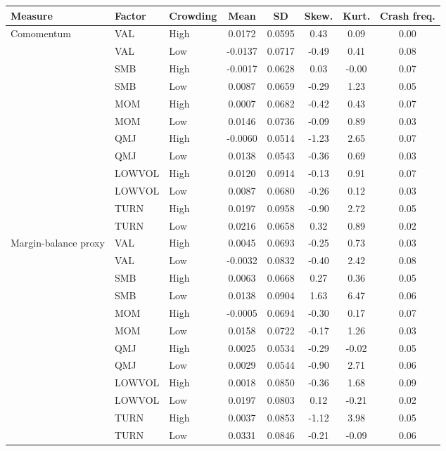 \begingroup\footnotesize\setlength{\tabcolsep}{2.5pt}
\begin{tabular}{lllccccc}
\toprule
Measure & Factor & Crowding & Mean & SD & Skew. & Kurt. & Crash freq. \\
\midrule
Comomentum & VAL & High & 0.0172 & 0.0595 & 0.43 & 0.09 & 0.00 \\
 & VAL & Low & -0.0137 & 0.0717 & -0.49 & 0.41 & 0.08 \\
 & SMB & High & -0.0017 & 0.0628 & 0.03 & -0.00 & 0.07 \\
 & SMB & Low & 0.0087 & 0.0659 & -0.29 & 1.23 & 0.05 \\
 & MOM & High & 0.0007 & 0.0682 & -0.42 & 0.43 & 0.07 \\
 & MOM & Low & 0.0146 & 0.0736 & -0.09 & 0.89 & 0.03 \\
 & QMJ & High & -0.0060 & 0.0514 & -1.23 & 2.65 & 0.07 \\
 & QMJ & Low & 0.0138 & 0.0543 & -0.36 & 0.69 & 0.03 \\
 & LOWVOL & High & 0.0120 & 0.0914 & -0.13 & 0.91 & 0.07 \\
 & LOWVOL & Low & 0.0087 & 0.0680 & -0.26 & 0.12 & 0.03 \\
 & TURN & High & 0.0197 & 0.0958 & -0.90 & 2.72 & 0.05 \\
 & TURN & Low & 0.0216 & 0.0658 & 0.32 & 0.89 & 0.02 \\
\midrule
Margin-balance proxy & VAL & High & 0.0045 & 0.0693 & -0.25 & 0.73 & 0.03 \\
 & VAL & Low & -0.0032 & 0.0832 & -0.40 & 2.42 & 0.08 \\
 & SMB & High & 0.0063 & 0.0668 & 0.27 & 0.36 & 0.05 \\
 & SMB & Low & 0.0138 & 0.0904 & 1.63 & 6.47 & 0.06 \\
 & MOM & High & -0.0005 & 0.0694 & -0.30 & 0.17 & 0.07 \\
 & MOM & Low & 0.0158 & 0.0722 & -0.17 & 1.26 & 0.03 \\
 & QMJ & High & 0.0025 & 0.0534 & -0.29 & -0.02 & 0.05 \\
 & QMJ & Low & 0.0029 & 0.0544 & -0.90 & 2.71 & 0.06 \\
 & LOWVOL & High & 0.0018 & 0.0850 & -0.36 & 1.68 & 0.09 \\
 & LOWVOL & Low & 0.0197 & 0.0803 & 0.12 & -0.21 & 0.02 \\
 & TURN & High & 0.0037 & 0.0853 & -1.12 & 3.98 & 0.05 \\
 & TURN & Low & 0.0331 & 0.0846 & -0.21 & -0.09 & 0.06 \\
\bottomrule
\end{tabular}

\endgroup